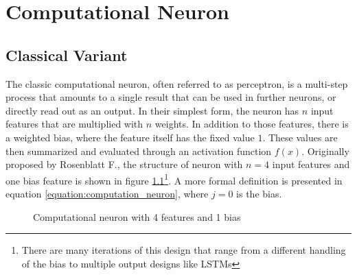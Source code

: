 \chapter{Computational Neuron} %

\label{chapter:computational_neuron} %


\newcommand{\keyword}[1]{\textbf{#1}}
\newcommand{\tabhead}[1]{\textbf{#1}}
\newcommand{\code}[1]{\texttt{#1}}
\newcommand{\file}[1]{\texttt{\bfseries#1}}
\newcommand{\option}[1]{\texttt{\itshape#1}}


\section{Classical Variant}
The classic computational neuron, often referred to as perceptron, is a multi-step process that amounts to a single result that can be used in further neurons, or directly read out as an output. In their simplest form, the neuron has $n$ input features that are multiplied with $n$ weights. In addition to those features, there is a weighted bias, where the feature itself has the fixed value $1$. These values are then summarized and evaluated through an activation function $f(x)$. Originally proposed by Rosenblatt F.\cite{rosenblatt_perceptron_1958}, the structure of neuron with $n = 4$ input features and one bias feature is shown in figure \ref{figure:computation_neuron}\footnote{There are many iterations of this design that range from a different handling of the bias to multiple output designs like LSTMs\cite{lstm}}. A more formal definition is presented in equation \ref{equation:computation_neuron}, where $j=0$ is the bias.

\begin{figure}[h!]
    \centering
    \caption{Computational neuron with 4 features and 1 bias}
    \label{figure:computation_neuron}
\end{figure}


